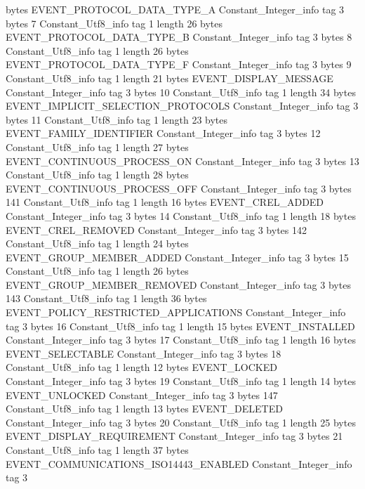 {{{			bytes	EVENT_PROTOCOL_DATA_TYPE_A
		}
		Constant_Integer_info {
			tag	3
			bytes	7
		}
		Constant_Utf8_info {
			tag	1
			length	26
			bytes	EVENT_PROTOCOL_DATA_TYPE_B
		}
		Constant_Integer_info {
			tag	3
			bytes	8
		}
		Constant_Utf8_info {
			tag	1
			length	26
			bytes	EVENT_PROTOCOL_DATA_TYPE_F
		}
		Constant_Integer_info {
			tag	3
			bytes	9
		}
		Constant_Utf8_info {
			tag	1
			length	21
			bytes	EVENT_DISPLAY_MESSAGE
		}
		Constant_Integer_info {
			tag	3
			bytes	10
		}
		Constant_Utf8_info {
			tag	1
			length	34
			bytes	EVENT_IMPLICIT_SELECTION_PROTOCOLS
		}
		Constant_Integer_info {
			tag	3
			bytes	11
		}
		Constant_Utf8_info {
			tag	1
			length	23
			bytes	EVENT_FAMILY_IDENTIFIER
		}
		Constant_Integer_info {
			tag	3
			bytes	12
		}
		Constant_Utf8_info {
			tag	1
			length	27
			bytes	EVENT_CONTINUOUS_PROCESS_ON
		}
		Constant_Integer_info {
			tag	3
			bytes	13
		}
		Constant_Utf8_info {
			tag	1
			length	28
			bytes	EVENT_CONTINUOUS_PROCESS_OFF
		}
		Constant_Integer_info {
			tag	3
			bytes	141
		}
		Constant_Utf8_info {
			tag	1
			length	16
			bytes	EVENT_CREL_ADDED
		}
		Constant_Integer_info {
			tag	3
			bytes	14
		}
		Constant_Utf8_info {
			tag	1
			length	18
			bytes	EVENT_CREL_REMOVED
		}
		Constant_Integer_info {
			tag	3
			bytes	142
		}
		Constant_Utf8_info {
			tag	1
			length	24
			bytes	EVENT_GROUP_MEMBER_ADDED
		}
		Constant_Integer_info {
			tag	3
			bytes	15
		}
		Constant_Utf8_info {
			tag	1
			length	26
			bytes	EVENT_GROUP_MEMBER_REMOVED
		}
		Constant_Integer_info {
			tag	3
			bytes	143
		}
		Constant_Utf8_info {
			tag	1
			length	36
			bytes	EVENT_POLICY_RESTRICTED_APPLICATIONS
		}
		Constant_Integer_info {
			tag	3
			bytes	16
		}
		Constant_Utf8_info {
			tag	1
			length	15
			bytes	EVENT_INSTALLED
		}
		Constant_Integer_info {
			tag	3
			bytes	17
		}
		Constant_Utf8_info {
			tag	1
			length	16
			bytes	EVENT_SELECTABLE
		}
		Constant_Integer_info {
			tag	3
			bytes	18
		}
		Constant_Utf8_info {
			tag	1
			length	12
			bytes	EVENT_LOCKED
		}
		Constant_Integer_info {
			tag	3
			bytes	19
		}
		Constant_Utf8_info {
			tag	1
			length	14
			bytes	EVENT_UNLOCKED
		}
		Constant_Integer_info {
			tag	3
			bytes	147
		}
		Constant_Utf8_info {
			tag	1
			length	13
			bytes	EVENT_DELETED
		}
		Constant_Integer_info {
			tag	3
			bytes	20
		}
		Constant_Utf8_info {
			tag	1
			length	25
			bytes	EVENT_DISPLAY_REQUIREMENT
		}
		Constant_Integer_info {
			tag	3
			bytes	21
		}
		Constant_Utf8_info {
			tag	1
			length	37
			bytes	EVENT_COMMUNICATIONS_ISO14443_ENABLED
		}
		Constant_Integer_info {
			tag	3
}}}
